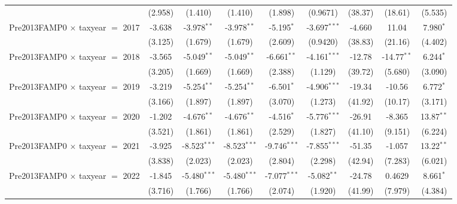 \begin{tabular}{lcccccccc}
                                           & (2.958)       & (1.410)        & (1.410)        & (1.898)        & (0.9671)       & (38.37)       & (18.61)       & (5.535)\\   
   Pre2013FAMP0 $\times$ taxyear $=$ 2017  & -3.638        & -3.978$^{**}$  & -3.978$^{**}$  & -5.195$^{*}$   & -3.697$^{***}$ & -4.660        & 11.04         & 7.980$^{*}$\\   
                                           & (3.125)       & (1.679)        & (1.679)        & (2.609)        & (0.9420)       & (38.83)       & (21.16)       & (4.402)\\   
   Pre2013FAMP0 $\times$ taxyear $=$ 2018  & -3.565        & -5.049$^{**}$  & -5.049$^{**}$  & -6.661$^{**}$  & -4.161$^{***}$ & -12.78        & -14.77$^{**}$ & 6.244$^{*}$\\   
                                           & (3.205)       & (1.669)        & (1.669)        & (2.388)        & (1.129)        & (39.72)       & (5.680)       & (3.090)\\   
   Pre2013FAMP0 $\times$ taxyear $=$ 2019  & -3.219        & -5.254$^{**}$  & -5.254$^{**}$  & -6.501$^{*}$   & -4.906$^{***}$ & -19.34        & -10.56        & 6.772$^{*}$\\   
                                           & (3.166)       & (1.897)        & (1.897)        & (3.070)        & (1.273)        & (41.92)       & (10.17)       & (3.171)\\   
   Pre2013FAMP0 $\times$ taxyear $=$ 2020  & -1.202        & -4.676$^{**}$  & -4.676$^{**}$  & -4.516$^{*}$   & -5.776$^{***}$ & -26.91        & -8.365        & 13.87$^{**}$\\   
                                           & (3.521)       & (1.861)        & (1.861)        & (2.529)        & (1.827)        & (41.10)       & (9.151)       & (6.224)\\   
   Pre2013FAMP0 $\times$ taxyear $=$ 2021  & -3.925        & -8.523$^{***}$ & -8.523$^{***}$ & -9.746$^{***}$ & -7.855$^{***}$ & -51.35        & -1.057        & 13.22$^{**}$\\   
                                           & (3.838)       & (2.023)        & (2.023)        & (2.804)        & (2.298)        & (42.94)       & (7.283)       & (6.021)\\   
   Pre2013FAMP0 $\times$ taxyear $=$ 2022  & -1.845        & -5.480$^{***}$ & -5.480$^{***}$ & -7.077$^{***}$ & -5.082$^{**}$  & -24.78        & 0.4629        & 8.661$^{*}$\\   
                                           & (3.716)       & (1.766)        & (1.766)        & (2.074)        & (1.920)        & (41.99)       & (7.979)       & (4.384)\\   

\end{tabular}
